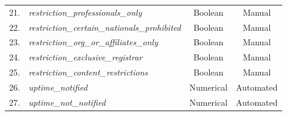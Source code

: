 \documentclass[11pt]{article}
\begin{document}
\begin{table}[htbp]
{\begin{tabular}{llcc}
            21. & \textit{restriction\_professionals\_only} & Boolean & Manual \\
            22. & \textit{restriction\_certain\_nationals\_prohibited} & Boolean & Manual \\
            23. & \textit{restriction\_org\_or\_affiliates\_only} & Boolean & Manual \\
            24. & \textit{restriction\_exclusive\_registrar} & Boolean & Manual \\
            25. & \textit{restriction\_content\_restrictions} & Boolean & Manual \\
        \midrule
            26. & \textit{uptime\_notified} & Numerical & Automated \\
            27. & \textit{uptime\_not\_notified} & Numerical & Automated \\
        \bottomrule
    \end{tabular}
}
\end{table}
\end{document}

